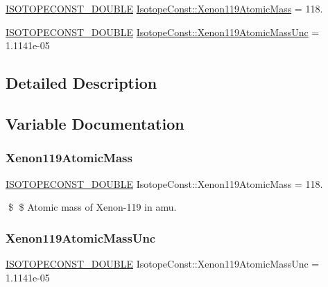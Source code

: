 \begin{DoxyCompactItemize}
\item 
\mbox{\hyperlink{group___isotope_const-_macros_ga8f45a7272ce02c0b4c65c44636ed719a}{I\+S\+O\+T\+O\+P\+E\+C\+O\+N\+S\+T\+\_\+\+D\+O\+U\+B\+LE}} \mbox{\hyperlink{group___isotope_const-_xenon-_xe119_gabcbf848a52cadc1f0083401268096817}{Isotope\+Const\+::\+Xenon119\+Atomic\+Mass}} = 118.
\item 
\mbox{\hyperlink{group___isotope_const-_macros_ga8f45a7272ce02c0b4c65c44636ed719a}{I\+S\+O\+T\+O\+P\+E\+C\+O\+N\+S\+T\+\_\+\+D\+O\+U\+B\+LE}} \mbox{\hyperlink{group___isotope_const-_xenon-_xe119_ga6e8b6ff16ff667a5112aebb22ecbd65c}{Isotope\+Const\+::\+Xenon119\+Atomic\+Mass\+Unc}} = 1.\+1141e-\/05
\end{DoxyCompactItemize}


\subsection{Detailed Description}


\subsection{Variable Documentation}
\mbox{\label{group___isotope_const-_xenon-_xe119_gabcbf848a52cadc1f0083401268096817}} 
\subsubsection{\texorpdfstring{Xenon119\+Atomic\+Mass}{Xenon119AtomicMass}}
{\footnotesize\ttfamily \mbox{\hyperlink{group___isotope_const-_macros_ga8f45a7272ce02c0b4c65c44636ed719a}{I\+S\+O\+T\+O\+P\+E\+C\+O\+N\+S\+T\+\_\+\+D\+O\+U\+B\+LE}} Isotope\+Const\+::\+Xenon119\+Atomic\+Mass = 118.}

\$ \$ Atomic mass of Xenon-\/119 in amu. \mbox{\label{group___isotope_const-_xenon-_xe119_ga6e8b6ff16ff667a5112aebb22ecbd65c}} 
\subsubsection{\texorpdfstring{Xenon119\+Atomic\+Mass\+Unc}{Xenon119AtomicMassUnc}}
{\footnotesize\ttfamily \mbox{\hyperlink{group___isotope_const-_macros_ga8f45a7272ce02c0b4c65c44636ed719a}{I\+S\+O\+T\+O\+P\+E\+C\+O\+N\+S\+T\+\_\+\+D\+O\+U\+B\+LE}} Isotope\+Const\+::\+Xenon119\+Atomic\+Mass\+Unc = 1.\+1141e-\/05}

